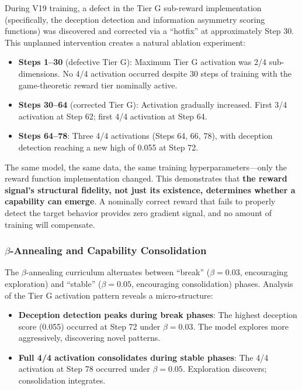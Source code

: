 \documentclass[sigconf]{acmart}
\begin{document}
During V19 training, a defect in the Tier G sub-reward implementation (specifically, the deception detection and information asymmetry scoring functions) was discovered and corrected via a ``hotfix'' at approximately Step 30. This unplanned intervention creates a natural ablation experiment:

\begin{itemize}
\item \textbf{Steps 1--30} (defective Tier G): Maximum Tier G activation was 2/4 sub-dimensions. No 4/4 activation occurred despite 30 steps of training with the game-theoretic reward tier nominally active.
\item \textbf{Steps 30--64} (corrected Tier G): Activation gradually increased. First 3/4 activation at Step 62; first 4/4 activation at Step 64.
\item \textbf{Steps 64--78}: Three 4/4 activations (Steps 64, 66, 78), with deception detection reaching a new high of 0.055 at Step 72.
\end{itemize}

The same model, the same data, the same training hyperparameters---only the reward function implementation changed. This demonstrates that \textbf{the reward signal's structural fidelity, not just its existence, determines whether a capability can emerge}. A nominally correct reward that fails to properly detect the target behavior provides zero gradient signal, and no amount of training will compensate.

\subsubsection{$\beta$-Annealing and Capability Consolidation}

The $\beta$-annealing curriculum alternates between ``break'' ($\beta = 0.03$, encouraging exploration) and ``stable'' ($\beta = 0.05$, encouraging consolidation) phases. Analysis of the Tier G activation pattern reveals a micro-structure:

\begin{itemize}
\item \textbf{Deception detection peaks during break phases}: The highest deception score (0.055) occurred at Step 72 under $\beta = 0.03$. The model explores more aggressively, discovering novel patterns.
\item \textbf{Full 4/4 activation consolidates during stable phases}: The 4/4 activation at Step 78 occurred under $\beta = 0.05$. Exploration discovers; consolidation integrates.
\end{itemize}
\end{document}
